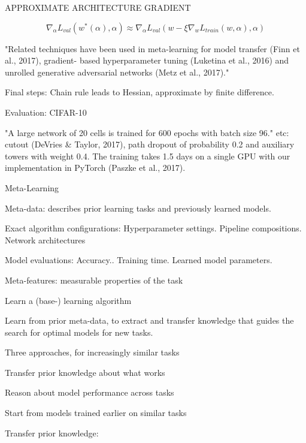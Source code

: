 \documentclass[english]{article}
\begin{document}
\item APPROXIMATE ARCHITECTURE GRADIENT

$$\nabla_\alpha L_{val}(w^*(\alpha),\alpha)
\approx
\nabla_\alpha L_{val}(w-\xi \nabla_w L_{train}(w,\alpha),\alpha)
$$

"Related techniques have been used in meta-learning for model transfer (Finn et al., 2017), gradient-
based hyperparameter tuning (Luketina et al., 2016) and unrolled generative adversarial networks
(Metz et al., 2017)."

Final steps: Chain rule leads to Hessian, approximate by finite difference. 

\item Evaluation: CIFAR-10 

"A large network of 20 cells is trained for 600 epochs with batch size 96." etc: cutout (DeVries \& Taylor, 2017), path dropout of
probability 0.2 and auxiliary towers with weight 0.4. The training takes 1.5 days on a single GPU
with our implementation in PyTorch (Paszke et al., 2017).

\eenum

\item Meta-Learning

\benum 
\item Meta-data: describes prior learning tasks and previously learned models.

Exact algorithm configurations: Hyperparameter settings. Pipeline compositions. Network architectures


Model evaluations: Accuracy.. Training time.  Learned model parameters.

Meta-features: measurable properties of the task 

\item Learn a (base-) learning algorithm

Learn from prior meta-data, to extract and transfer knowledge that guides the search for optimal models for new tasks.

\item Three approaches, for increasingly similar tasks


\benum 
\item Transfer prior knowledge about what works
\item Reason about model performance across tasks
\item Start from models trained earlier on similar tasks
\eenum

\item Transfer prior knowledge: 
\end{document}
